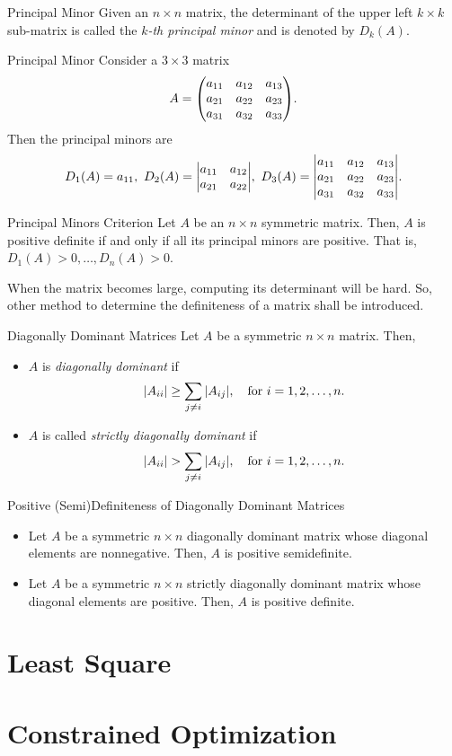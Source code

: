 \begin{df}{Principal Minor}
	Given an $n\times n$ matrix, the determinant of the upper left $k\times k$ sub-matrix is called the \textit{$k$-th principal minor} and is denoted by $D_k(A)$.
\end{df}
\begin{eg}{Principal Minor}
	Consider a $3\times 3$ matrix \[A=\mqty(a_{11}&a_{12}&a_{13}\\a_{21}&a_{22}&a_{23}\\a_{31}&a_{32}&a_{33}).\]	Then the principal minors are \[D_1(A)=a_{11},\ D_2(A)=\mqty|a_{11}&a_{12}\\a_{21}&a_{22}|,\ D_3(A)=\mqty|a_{11}&a_{12}&a_{13}\\a_{21}&a_{22}&a_{23}\\a_{31}&a_{32}&a_{33}|.\]
\end{eg}
\begin{thm}{Principal Minors Criterion}
	Let $A$ be an $n\times n$ symmetric matrix. Then, $A$ is positive definite if and only if all its principal minors are positive. That is, $D_1(A)>0,\dots,D_n(A)>0$.
\end{thm}
\begin{rmk}
	When the matrix becomes large, computing its determinant will be hard. So, other method to determine the definiteness of a matrix shall be introduced. 	
\end{rmk}
\begin{df}{Diagonally Dominant Matrices}
	Let $A$ be a symmetric $n\times n$ matrix. Then, 
	\begin{itemize}
		\item $A$ is \textit{diagonally dominant} if \[\qty|A_{ii}|\geq\sum_{j\neq i}\qty|A_{ij}|,\quad\text{for }i=1,2,\dots,n.\]
		\item $A$ is called \textit{strictly diagonally dominant} if \[\qty|A_{ii}|>\sum_{j\neq i}\qty|A_{ij}|,\quad\text{for }i=1,2,\dots,n.\]
	\end{itemize}	
\end{df}
\begin{thm}{Positive (Semi)Definiteness of Diagonally Dominant Matrices}
	\begin{itemize}
		\item Let $A$ be a symmetric $n\times n$ diagonally dominant matrix whose diagonal elements are nonnegative. Then, $A$ is positive semidefinite.
		\item Let $A$ be a symmetric $n\times n$ strictly diagonally dominant matrix whose diagonal elements are positive. Then, $A$ is positive definite. 
	\end{itemize}	
\end{thm}


\newpage
\section{Least Square}

\newpage
\section{Constrained Optimization}

